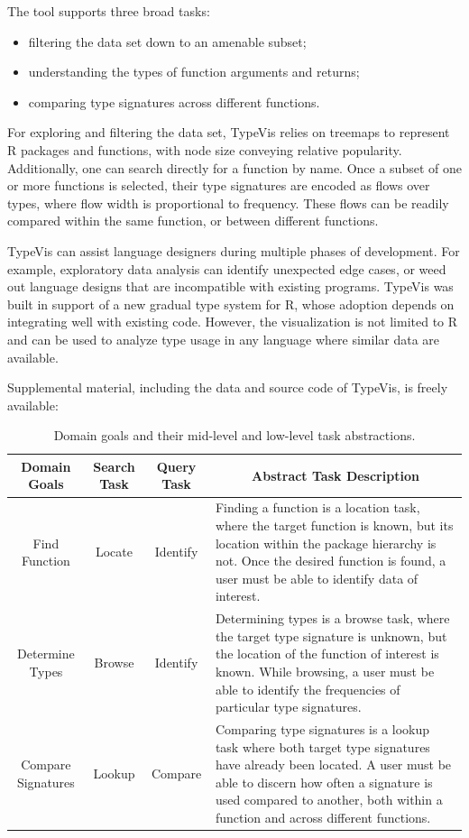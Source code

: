 \documentclass[review]{vgtc}                 %
\newcommand{\typevis}{{\sc TypeVis}\xspace}
\begin{document}
The tool supports three broad tasks:
\begin{itemize}
  \setlength\itemsep{0em}
  \item filtering the data set down to an amenable subset;
  \item understanding the types of function arguments and returns;
  \item comparing type signatures across different functions.
\end{itemize}
For exploring and filtering the data set,
\typevis relies on treemaps to represent R packages and functions,
with node size conveying relative popularity.
Additionally, one can search directly for a function by name.
Once a subset of one or more functions is selected,
their type signatures are encoded as flows over types,
where flow width is proportional to frequency.
These flows can be readily compared within the same function,
or between different functions.

\typevis can assist language designers during multiple phases of development.
For example, exploratory data analysis can identify unexpected edge cases,
or weed out language designs that are incompatible with existing programs.
\typevis was built in support of a new gradual type system for R,
whose adoption depends on integrating well with existing code.
However, the visualization is not limited to R and can be used to
analyze type usage in any language where similar data are available.

Supplemental material, including the data and source code of
\typevis, is freely available: 

\bgroup
\def\arraystretch{1.75}
\begin{table}
  \centering
  \begin{tabularx}{\linewidth}{c|c|c|X}
    Domain Goals & Search Task & Query Task & \multicolumn{1}{c}{Abstract Task Description} \\
    \hline
    Find Function & Locate & Identify & Finding a function is a location task, where the target function is known, but its location within the package hierarchy is not. Once the desired function is found, a user must be able to identify data of interest. \\

    Determine Types & Browse & Identify & Determining types is a browse task, where the target type signature is unknown, but the location of the function of interest is known. While browsing, a user must be able to identify the frequencies of particular type signatures.\\

    Compare Signatures & Lookup & Compare & Comparing type signatures is a lookup task where both target type signatures have already been located. A user must be able to discern how often a signature is used compared to another, both within a function and across different functions.\\
  \end{tabularx}
  \caption{Domain goals and their mid-level and low-level task abstractions.}
  \label{tab:tasks}
\end{table}
\egroup
\end{document}
